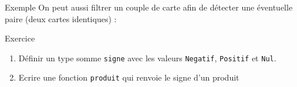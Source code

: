 \documentclass[10pt]{beamer}
\begin{document}
\begin{frame}{\Ctitle}{\stitle}
	\begin{exampleblock}{Exemple}
		On peut aussi filtrer un couple de carte afin de détecter une éventuelle paire (deux cartes identiques) :
	\end{exampleblock}
\end{frame}


\begin{frame}{\Ctitle}{\stitle}
	\begin{exampleblock}{Exercice}
		\begin{enumerate}
			\item<1-> Définir un type somme {\tt signe} avec les valeurs {\tt Negatif}, {\tt Positif} et {\tt Nul}.
			\onslide<2-> 
			\item<3-> Ecrire une fonction {\tt produit} qui renvoie le signe d'un produit 
		\onslide<4-> 
		\end{enumerate}
	\end{exampleblock}
\end{frame}
\end{document}

